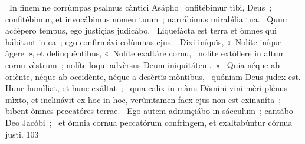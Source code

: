 {~In finem ne corrùmpas psalmus càntici Asápho}
{%
~onfitébimur tìbi, Deus~; confitébimur, et invocábimus nomen tuum~; narrábimus mirabìlia tua.
~Quum acċépero tempus, ego justìçias judicábo.
~Liquefàcta est terra et òmnes qui hábitant in ea~; ego confirmávi colùmnas ejus.
~Dixi iníquïs, «~Nolíte iníque àgere~», et delinquèntibus, «~Nolíte exaltáre cornu,
~nolíte extòllere in altum cornu vèstrum~; nolíte loqui advèrsus Deum iniquitátem.~»
~Quia néque ab oriènte, néque ab ocċidènte, néque a desèrtïs mòntibus,
~quóniam Deus judex est. Hunc humìliat, et hunc exàltat~;
~quia calix in mànu Dòmini vini mèri plénus mìxto, et inclinávit ex hoc in hoc, verùmtamen faex ejus non est exinaníta~; bibent òmnes peccatóres terrae.
~Ego autem adnunçiábo in sáeculum~; cantábo Deo Jacóbi~;
~et òmnia cornua peccatórum confrìngem, et exaltabùntur córnua justi.}
{10}{3}
